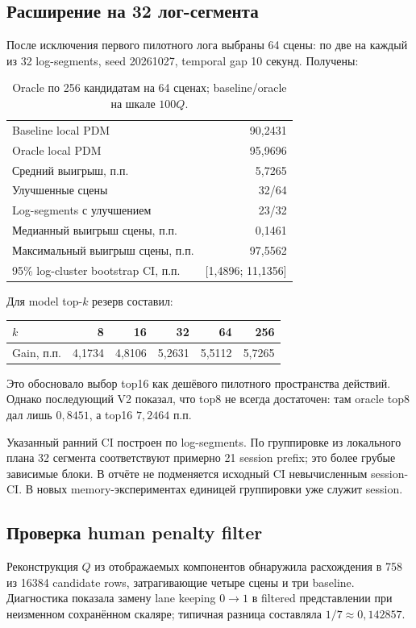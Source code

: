 \documentclass[11pt,a4paper]{article}
\begin{document}
\subsection{Расширение на 32 лог-сегмента}
После исключения первого пилотного лога выбраны 64 сцены: по две на каждый из 32 log-segments, seed 20261027, temporal gap 10 секунд. Получены:
\par
\begin{table}[htbp]\centering\small
\caption{Oracle по 256 кандидатам на 64 сценах; baseline/oracle на шкале $100Q$.}
\begin{tabular}{@{}lr@{}}\toprule
Baseline local PDM & 90,2431\\
Oracle local PDM & 95,9696\\
Средний выигрыш, п.п. & 5,7265\\
Улучшенные сцены & 32/64\\
Log-segments с улучшением & 23/32\\
Медианный выигрыш сцены, п.п. & 0,1461\\
Максимальный выигрыш сцены, п.п. & 97,5562\\
95\% log-cluster bootstrap CI, п.п. & [1,4896; 11,1356]\\\bottomrule
\end{tabular}
\end{table}
\par

Для model top-$k$ резерв составил:
\begin{center}\small
\begin{tabular}{@{}lrrrrr@{}}\toprule
$k$ & 8 & 16 & 32 & 64 & 256\\\midrule
Gain, п.п. & 4,1734 & 4,8106 & 5,2631 & 5,5112 & 5,7265\\\bottomrule
\end{tabular}
\end{center}
Это обосновало выбор top16 как дешёвого пилотного пространства действий. Однако последующий V2 показал, что top8 не всегда достаточен: там oracle top8 дал лишь $0{,}8451$, а top16 $7{,}2464$ п.п.

Указанный ранний CI построен по log-segments. По группировке из локального плана 32 сегмента соответствуют примерно 21 session prefix; это более грубые зависимые блоки. В отчёте не подменяется исходный CI невычисленным session-CI. В новых memory-экспериментах единицей группировки уже служит session.

\subsection{Проверка human penalty filter}
Реконструкция $Q$ из отображаемых компонентов обнаружила расхождения в 758 из 16384 candidate rows, затрагивающие четыре сцены и три baseline. Диагностика показала замену lane keeping $0\rightarrow1$ в filtered представлении при неизменном сохранённом скаляре; типичная разница составляла $1/7\approx0{,}142857$.
\end{document}
